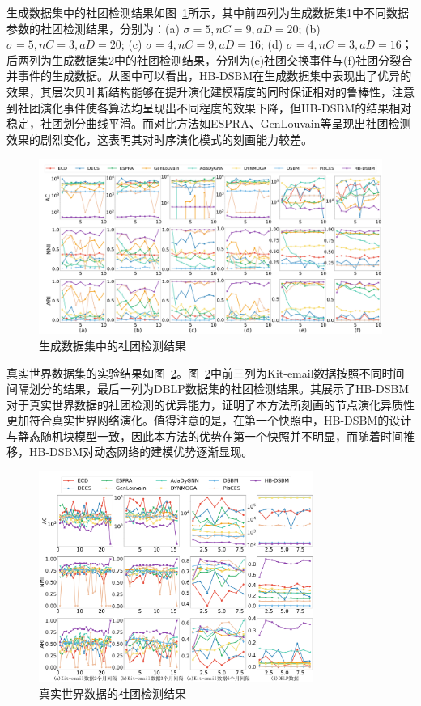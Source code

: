 生成数据集中的社团检测结果如图~\ref{fig.4.2}所示，其中前四列为生成数据集1中不同数据参数的社团检测结果，分别为：(a) $\sigma =5, nC=9, aD=20$; (b) $\sigma =5, nC=3, aD=20$; (c) $\sigma =4, nC=9, aD=16$; (d) $\sigma =4, nC=3, aD=16$；后两列为生成数据集2中的社团检测结果，分别为(e)社团交换事件与(f)社团分裂合并事件的生成数据。从图中可以看出，HB-DSBM在生成数据集中表现出了优异的效果，其层次贝叶斯结构能够在提升演化建模精度的同时保证相对的鲁棒性，注意到社团演化事件使各算法均呈现出不同程度的效果下降，但HB-DSBM的结果相对稳定，社团划分曲线平滑。而对比方法如ESPRA、GenLouvain等呈现出社团检测效果的剧烈变化，这表明其对时序演化模式的刻画能力较差。


\begin{figure}[!htbp]
	\centering
	\includegraphics[width=\textwidth]{figures/chap03/dsbm/chap3generateData1223.pdf}
	\caption{生成数据集中的社团检测结果}
	\label{fig.4.2}
\end{figure}



真实世界数据集的实验结果如图~\ref{fig.4.4}。图~\ref{fig.4.4}中前三列为Kit-email数据按照不同时间间隔划分的结果，最后一列为DBLP数据集的社团检测结果。其展示了HB-DSBM对于真实世界数据的社团检测的优异能力，证明了本方法所刻画的节点演化异质性更加符合真实世界网络演化。值得注意的是，在第一个快照中，HB-DSBM的设计与静态随机块模型一致，因此本方法的优势在第一个快照并不明显，而随着时间推移，HB-DSBM对动态网络的建模优势逐渐显现。



\begin{figure}[!htbp]
	\centering
	\includegraphics[width=0.8\textwidth]{figures/chap03/dsbm/chap3realData1223.pdf}
	\caption{真实世界数据的社团检测结果}
	\label{fig.4.4}
\end{figure}




